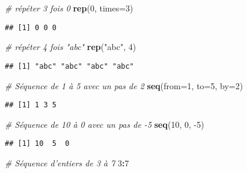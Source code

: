 \documentclass[]{book}
\newenvironment{Shaded}{\begin{snugshade}}{\end{snugshade}}
\newcommand{\CommentTok}[1]{\textcolor[rgb]{0.56,0.35,0.01}{\textit{#1}}}
\newcommand{\DataTypeTok}[1]{\textcolor[rgb]{0.13,0.29,0.53}{#1}}
\newcommand{\DecValTok}[1]{\textcolor[rgb]{0.00,0.00,0.81}{#1}}
\newcommand{\KeywordTok}[1]{\textcolor[rgb]{0.13,0.29,0.53}{\textbf{#1}}}
\newcommand{\NormalTok}[1]{#1}
\newcommand{\OperatorTok}[1]{\textcolor[rgb]{0.81,0.36,0.00}{\textbf{#1}}}
\newcommand{\StringTok}[1]{\textcolor[rgb]{0.31,0.60,0.02}{#1}}
\begin{document}
\begin{Shaded}
\begin{Highlighting}[]
\CommentTok{# répéter 3 fois 0}
\KeywordTok{rep}\NormalTok{(}\DecValTok{0}\NormalTok{, }\DataTypeTok{times=}\DecValTok{3}\NormalTok{)}
\end{Highlighting}
\end{Shaded}

\begin{verbatim}
## [1] 0 0 0
\end{verbatim}

\begin{Shaded}
\begin{Highlighting}[]
\CommentTok{# répéter 4 fois "abc"}
\KeywordTok{rep}\NormalTok{(}\StringTok{"abc"}\NormalTok{, }\DecValTok{4}\NormalTok{)}
\end{Highlighting}
\end{Shaded}

\begin{verbatim}
## [1] "abc" "abc" "abc" "abc"
\end{verbatim}

\begin{Shaded}
\begin{Highlighting}[]
\CommentTok{# Séquence de 1 à 5 avec un pas de 2}
\KeywordTok{seq}\NormalTok{(}\DataTypeTok{from=}\DecValTok{1}\NormalTok{, }\DataTypeTok{to=}\DecValTok{5}\NormalTok{, }\DataTypeTok{by=}\DecValTok{2}\NormalTok{)}
\end{Highlighting}
\end{Shaded}

\begin{verbatim}
## [1] 1 3 5
\end{verbatim}

\begin{Shaded}
\begin{Highlighting}[]
\CommentTok{# Séquence de 10 à 0 avec un pas de -5}
\KeywordTok{seq}\NormalTok{(}\DecValTok{10}\NormalTok{, }\DecValTok{0}\NormalTok{, }\DecValTok{-5}\NormalTok{)}
\end{Highlighting}
\end{Shaded}

\begin{verbatim}
## [1] 10  5  0
\end{verbatim}

\begin{Shaded}
\begin{Highlighting}[]
\CommentTok{# Séquence d'entiers de 3 à 7}
\DecValTok{3}\OperatorTok{:}\DecValTok{7}
\end{Highlighting}
\end{Shaded}
\end{document}
